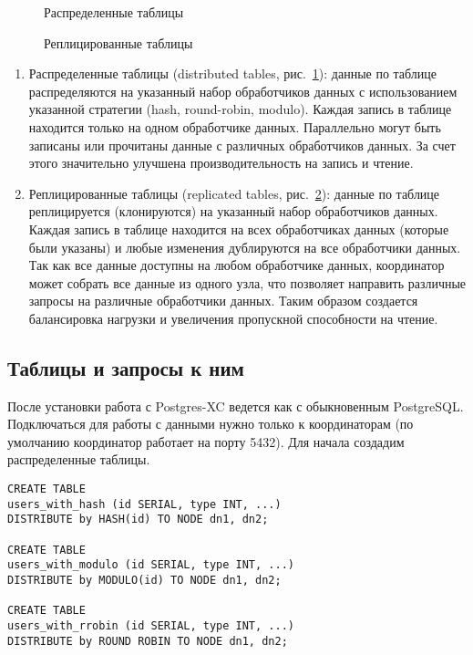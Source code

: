 \begin{figure}[ht!]
  \caption{Распределенные таблицы}
  \label{fig:postgres-xc2}
\end{figure}

\begin{figure}[ht!]
  \caption{Реплицированные таблицы}
  \label{fig:postgres-xc3}
\end{figure}

\begin{enumerate}
\item Распределенные таблицы (distributed tables, рис.~\ref{fig:postgres-xc2}): данные по таблице распределяются на указанный набор обработчиков данных с использованием указанной стратегии (hash, round-robin, modulo). Каждая запись в таблице находится только на одном обработчике данных. Параллельно могут быть записаны или прочитаны данные с различных обработчиков данных. За счет этого значительно улучшена производительность на запись и чтение.
\item Реплицированные таблицы (replicated tables, рис.~\ref{fig:postgres-xc3}): данные по таблице реплицируется (клонируются) на указанный набор обработчиков данных. Каждая запись в таблице находится на всех обработчиках данных (которые были указаны) и любые изменения дублируются на все обработчики данных. Так как все данные доступны на любом обработчике данных, координатор может собрать все данные из одного узла, что позволяет направить различные запросы на различные обработчики данных. Таким образом создается балансировка нагрузки и увеличения пропускной способности на чтение.
\end{enumerate}

\subsection{Таблицы и запросы к ним}

После установки работа с Postgres-XC ведется как с обыкновенным PostgreSQL. Подключаться для работы с данными нужно только к координаторам (по умолчанию координатор работает на порту 5432). Для начала создадим распределенные таблицы.

\begin{lstlisting}[label=lst:postgres-xc2,caption=Создание распределенных таблиц]
CREATE TABLE 
users_with_hash (id SERIAL, type INT, ...) 
DISTRIBUTE by HASH(id) TO NODE dn1, dn2;

CREATE TABLE 
users_with_modulo (id SERIAL, type INT, ...) 
DISTRIBUTE by MODULO(id) TO NODE dn1, dn2;

CREATE TABLE 
users_with_rrobin (id SERIAL, type INT, ...) 
DISTRIBUTE by ROUND ROBIN TO NODE dn1, dn2;
\end{lstlisting}

